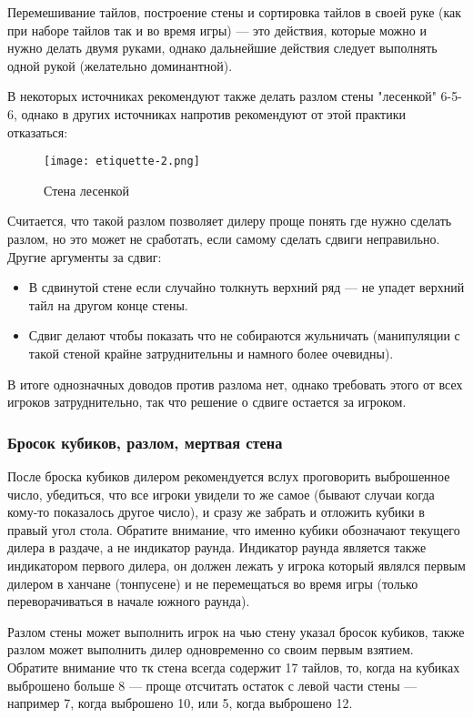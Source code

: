 Перемешивание тайлов, построение стены и сортировка тайлов в своей руке (как при наборе тайлов так и во время игры) --- это действия, которые можно и нужно делать двумя руками, однако дальнейшие действия следует выполнять одной рукой (желательно доминантной).

В некоторых источниках рекомендуют также делать разлом стены "лесенкой" 6-5-6, однако в других источниках напротив рекомендуют от этой практики отказаться:

\begin{figure}[H]
	\centering
	\texttt{[image: etiquette-2.png]}
	\caption{Стена лесенкой}
\end{figure}

Считается, что такой разлом позволяет дилеру проще понять где нужно сделать разлом, но это может не сработать, если самому сделать сдвиги неправильно. Другие аргументы за сдвиг:
\begin{itemize}
	\item В сдвинутой стене если случайно толкнуть верхний ряд --- не упадет верхний тайл на другом конце стены.
	\item Сдвиг делают чтобы показать что не собираются жульничать (манипуляции с такой стеной крайне затруднительны и намного более очевидны).
\end{itemize} 
В итоге однозначных доводов против разлома нет, однако требовать этого от всех игроков затруднительно, так что решение о сдвиге остается за игроком.

\subsubsection{Бросок кубиков, разлом, мертвая стена}

После броска кубиков дилером рекомендуется вслух проговорить выброшенное число, убедиться, что все игроки увидели то же самое (бывают случаи когда кому-то показалось другое число), и сразу же забрать и отложить кубики в правый угол стола. Обратите внимание, что именно кубики обозначают текущего дилера в раздаче, а не индикатор раунда. Индикатор раунда является также индикатором первого дилера, он должен лежать у игрока который являлся первым дилером в ханчане (тонпусене) и не перемещаться во время игры (только переворачиваться в начале южного раунда). 

Разлом стены может выполнить игрок на чью стену указал бросок кубиков, также разлом может выполнить дилер одновременно со своим первым взятием. Обратите внимание что тк стена всегда содержит 17 тайлов, то, когда на кубиках выброшено больше 8 --- проще отсчитать остаток с левой части стены --- например 7, когда выброшено 10, или 5, когда выброшено 12. 

